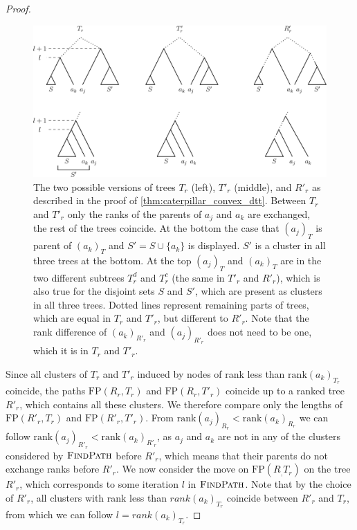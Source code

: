 \documentclass[11pt]{amsart}
\newcommand{\findpath}{\textsc{FindPath}}
\newcommand{\rank}{\mathrm{rank}}
\newcommand{\fp}{\mathrm{FP}}
\begin{document}
\begin{proof}
	\begin{figure}[ht]
		\includegraphics[width=1\textwidth]{caterpillar_convex.eps}
		\caption{The two possible versions of trees $T_r$ (left), $T'_r$ (middle), and $R'_r$ as described in the proof of \autoref{thm:caterpillar_convex_dtt}.
		Between $T_r$ and $T'_r$ only the ranks of the parents of $a_j$ and $a_k$ are exchanged, the rest of the trees coincide.
		At the bottom the case that $(a_j)_T$ is parent of $(a_k)_T$ and $S' = S \cup \{a_k\}$ is displayed.
		$S'$ is a cluster in all three trees at the bottom.
		At the top $(a_j)_T$ and $(a_k)_T$ are in the two different subtrees $T_r^d$ and $T_r^c$ (the same in $T'_r$ and $R'_r$), which is also true for the disjoint sets $S$ and $S'$, which are present as clusters in all three trees.
		Dotted lines represent remaining parts of trees, which are equal in $T_r$ and $T'_r$, but different to $R'_r$.
		Note that the rank difference of $(a_k)_{R'_r}$ and $(a_j)_{R'_r}$ does not need to be one, which it is in $T_r$ and $T'_r$.
		\label{fig:caterpillar_convex}}
	\end{figure}

	Since all clusters of $T_r$ and $T'_r$ induced by nodes of rank less than $\rank(a_k)_{T_r}$ coincide, the paths $\fp(R_r,T_r)$ and $\fp(R_r,T'_r)$ coincide up to a ranked tree $R'_r$, which contains all these clusters.
	We therefore compare only the lengths of $\fp(R'_r,T_r)$ and $\fp(R'_r,T'_r)$.
	From $\rank(a_j)_{R_r} < \rank(a_k)_{R_r}$ we can follow $\rank(a_j)_{R'_r} < \rank(a_k)_{R'_r}$, as $a_j$ and $a_k$ are not in any of the clusters considered by $\findpath$ before $R'_r$, which means that their parents do not exchange ranks before $R'_r$.
	We now consider the move on $\fp(R_,T_r)$ on the tree $R'_r$, which corresponds to some iteration $l$ in $\findpath$.
	Note that by the choice of $R'_r$, all clusters with rank less than $rank(a_k)_{T_r}$ coincide between $R'_r$ and $T_r$, from which we can follow $l = rank(a_k)_{T_r}$.


\end{proof}
\end{document}
